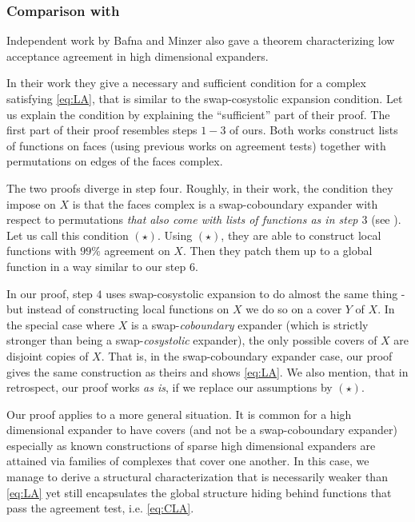 \documentclass{article}[11pt]
\begin{document}
\subsubsection*{Comparison with \cite{BafnaM2023}}
Independent work by Bafna and Minzer \cite{BafnaM2023} also gave a theorem characterizing low acceptance agreement in high dimensional expanders. 

In their work they give a necessary and sufficient condition for a complex satisfying \eqref{eq:LA}, that is similar to the swap-cosystolic expansion condition. Let us explain the condition by explaining the ``sufficient'' part of their proof. The first part of their proof resembles steps \(1-3\) of ours. Both works construct lists of functions on faces (using previous works on agreement tests) together with permutations on edges of the faces complex. 

The two proofs diverge in step four. Roughly, in their work, the condition they impose on \(X\) is that the faces complex is a swap-coboundary expander with respect to permutations \emph{that also come with lists of functions as in step \(3\)} (see \cite[Definitions 1.7,1.8]{BafnaM2023}). Let us call this condition $(\star)$. Using $(\star)$, they are able to construct local functions with \(99\%\) agreement on \(X\). Then they patch them up to a global function in a way similar to our step \(6\).

In our proof, step \(4\) uses swap-cosystolic expansion to do almost the same thing - but instead of constructing local functions on \(X\) we do so on a cover \(Y\) of \(X\). In the special case where \(X\) is a swap-{\em coboundary} expander (which is strictly stronger than being a swap-{\em cosystolic} expander), the only possible covers of \(X\) are disjoint copies of \(X\). That is, in the swap-coboundary expander case, our proof gives the same construction as theirs and shows \eqref{eq:LA}. We also mention, that in retrospect, our proof works {\em as is}, if we replace our assumptions by $(\star)$.

Our proof applies to a more general situation. It is common for a high dimensional expander to have covers (and not be a swap-coboundary expander) especially as known constructions of sparse high dimensional expanders are attained via families of complexes that cover one another. In this case, we manage to derive a structural characterization that is necessarily weaker than \eqref{eq:LA} yet still encapsulates the global structure hiding behind functions that pass the agreement test, i.e. \eqref{eq:CLA}.
\end{document}
